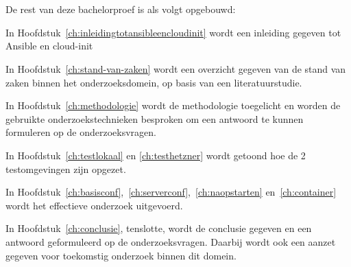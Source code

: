 

\section{}
\label{sec:opzet-bachelorproef}


De rest van deze bachelorproef is als volgt opgebouwd:

In Hoofdstuk~\ref{ch:inleidingtotansibleencloudinit} wordt een inleiding gegeven tot Ansible en cloud-init

In Hoofdstuk~\ref{ch:stand-van-zaken} wordt een overzicht gegeven van de stand van zaken binnen het onderzoeksdomein, op basis van een literatuurstudie.

In Hoofdstuk~\ref{ch:methodologie} wordt de methodologie toegelicht en worden de gebruikte onderzoekstechnieken besproken om een antwoord te kunnen formuleren op de onderzoeksvragen.

In Hoofdstuk~\ref{ch:testlokaal} en \ref{ch:testhetzner} wordt getoond hoe de 2 testomgevingen zijn opgezet.

In Hoofdstuk~\ref{ch:basisconf},~\ref{ch:serverconf},~\ref{ch:naopstarten} en~\ref{ch:container} wordt het effectieve onderzoek uitgevoerd.

In Hoofdstuk~\ref{ch:conclusie}, tenslotte, wordt de conclusie gegeven en een antwoord geformuleerd op de onderzoeksvragen. Daarbij wordt ook een aanzet gegeven voor toekomstig onderzoek binnen dit domein.